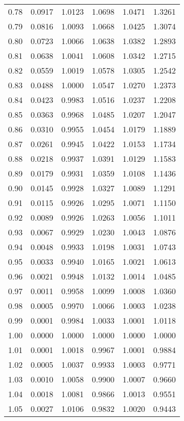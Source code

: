 \documentclass{article}
\begin{document}
\begin{longtable}{cccccc}
0.78 & 0.0917 & 1.0123 & 1.0698 & 1.0471 & 1.3261 \\
0.79 & 0.0816 & 1.0093 & 1.0668 & 1.0425 & 1.3074 \\
0.80 & 0.0723 & 1.0066 & 1.0638 & 1.0382 & 1.2893 \\
0.81 & 0.0638 & 1.0041 & 1.0608 & 1.0342 & 1.2715 \\
0.82 & 0.0559 & 1.0019 & 1.0578 & 1.0305 & 1.2542 \\
0.83 & 0.0488 & 1.0000 & 1.0547 & 1.0270 & 1.2373 \\
0.84 & 0.0423 & 0.9983 & 1.0516 & 1.0237 & 1.2208 \\
0.85 & 0.0363 & 0.9968 & 1.0485 & 1.0207 & 1.2047 \\
0.86 & 0.0310 & 0.9955 & 1.0454 & 1.0179 & 1.1889 \\
0.87 & 0.0261 & 0.9945 & 1.0422 & 1.0153 & 1.1734 \\
0.88 & 0.0218 & 0.9937 & 1.0391 & 1.0129 & 1.1583 \\
0.89 & 0.0179 & 0.9931 & 1.0359 & 1.0108 & 1.1436 \\
0.90 & 0.0145 & 0.9928 & 1.0327 & 1.0089 & 1.1291 \\
0.91 & 0.0115 & 0.9926 & 1.0295 & 1.0071 & 1.1150 \\
0.92 & 0.0089 & 0.9926 & 1.0263 & 1.0056 & 1.1011 \\
0.93 & 0.0067 & 0.9929 & 1.0230 & 1.0043 & 1.0876 \\
0.94 & 0.0048 & 0.9933 & 1.0198 & 1.0031 & 1.0743 \\
0.95 & 0.0033 & 0.9940 & 1.0165 & 1.0021 & 1.0613 \\
0.96 & 0.0021 & 0.9948 & 1.0132 & 1.0014 & 1.0485 \\
0.97 & 0.0011 & 0.9958 & 1.0099 & 1.0008 & 1.0360 \\
0.98 & 0.0005 & 0.9970 & 1.0066 & 1.0003 & 1.0238 \\
0.99 & 0.0001 & 0.9984 & 1.0033 & 1.0001 & 1.0118 \\
1.00 & 0.0000 & 1.0000 & 1.0000 & 1.0000 & 1.0000 \\
1.01 & 0.0001 & 1.0018 & 0.9967 & 1.0001 & 0.9884 \\
1.02 & 0.0005 & 1.0037 & 0.9933 & 1.0003 & 0.9771 \\
1.03 & 0.0010 & 1.0058 & 0.9900 & 1.0007 & 0.9660 \\
1.04 & 0.0018 & 1.0081 & 0.9866 & 1.0013 & 0.9551 \\
1.05 & 0.0027 & 1.0106 & 0.9832 & 1.0020 & 0.9443 \\

\end{longtable}
\end{document}
